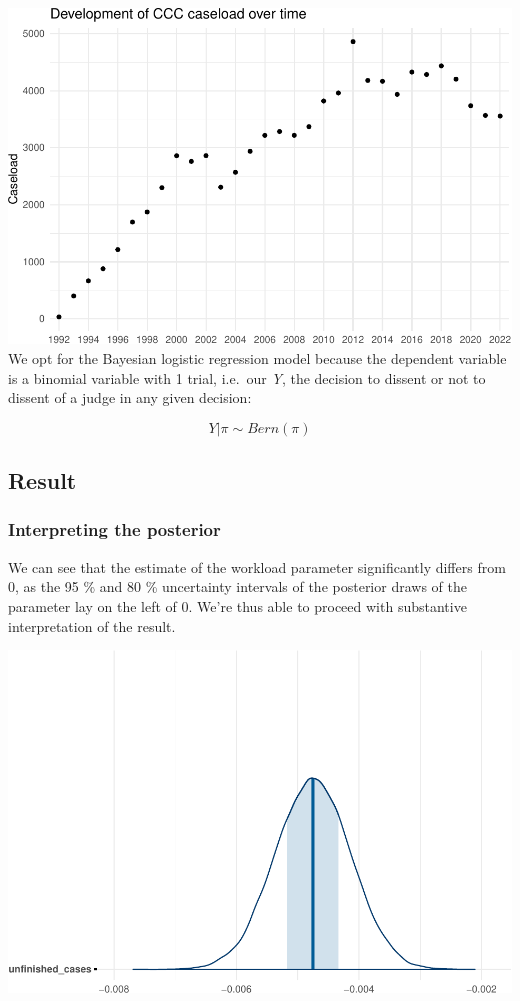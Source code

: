 \documentclass[
  11pt,
]{article}
\begin{document}
\includegraphics{dissents_article_files/figure-latex/caseload_over_time-1.pdf}
We opt for the Bayesian logistic regression model because the dependent
variable is a binomial variable with 1 trial, i.e.~our \emph{Y}, the
decision to dissent or not to dissent of a judge in any given decision:

\[
Y | \pi \sim Bern(\pi)
\]

\hypertarget{result-1}{%
\subsection{Result}\label{result-1}}

\hypertarget{interpreting-the-posterior}{%
\subsubsection{Interpreting the
posterior}\label{interpreting-the-posterior}}

We can see that the estimate of the workload parameter significantly
differs from 0, as the 95 \% and 80 \% uncertainty intervals of the
posterior draws of the parameter lay on the left of 0. We're thus able
to proceed with substantive interpretation of the result.

\includegraphics{dissents_article_files/figure-latex/interpreting_posterior2-1.pdf}
\end{document}
